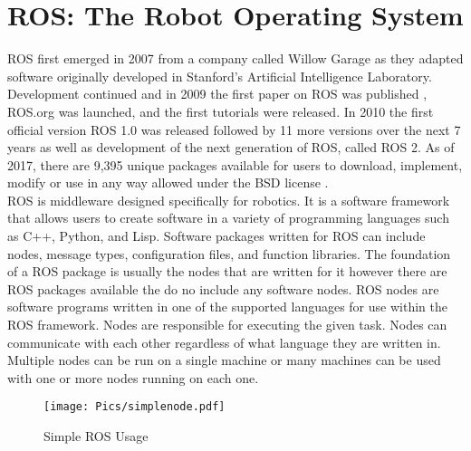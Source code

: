 \section{ROS: The Robot Operating System}
\label{sec:ros}

ROS first emerged in 2007 from a company called Willow Garage as they adapted software originally developed in Stanford's Artificial Intelligence Laboratory. Development continued and in 2009 the first paper on ROS was published \cite{rosfirst}, ROS.org was launched, and the first tutorials were released. In 2010 the first official version ROS 1.0 was released followed by 11 more versions over the next 7 years as well as development of the next generation of ROS, called ROS 2. As of 2017, there are 9,395 unique packages available for users to download, implement, modify or use in any way allowed under the BSD license \cite{bsd}.\\

ROS is middleware designed specifically for robotics. It is a software framework that allows users to create software in a variety of programming languages such as C++, Python, and Lisp. Software packages written for ROS can include nodes, message types, configuration files, and function libraries. The foundation of a ROS package is usually the nodes that are written for it however there are ROS packages available the do no include any software nodes. ROS nodes are software programs written in one of the supported languages for use within the ROS framework. Nodes are responsible for executing the given task. Nodes can communicate with each other regardless of what language they are written in. Multiple nodes can be run on a single machine or many machines can be used with one or more nodes running on each one.\\

\begin{figure}[h!]
    \centering
    \texttt{[image: Pics/simplenode.pdf]}
    \caption{Simple ROS Usage}
    \label{fig:rosmessage}
\end{figure}

